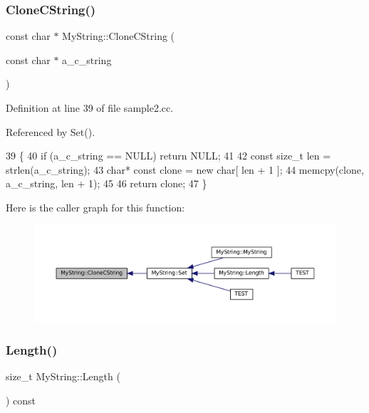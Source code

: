 \subsubsection{\texorpdfstring{Clone\+C\+String()}{CloneCString()}}
{\footnotesize\ttfamily const char $\ast$ My\+String\+::\+Clone\+C\+String (\begin{DoxyParamCaption}\item[{const char $\ast$}]{a\+\_\+c\+\_\+string }\end{DoxyParamCaption})\hspace{0.3cm}{\ttfamily [static]}}



Definition at line 39 of file sample2.\+cc.



Referenced by Set().


\begin{DoxyCode}
39                                                          \{
40   \textcolor{keywordflow}{if} (a\_c\_string == NULL) \textcolor{keywordflow}{return} NULL;
41 
42   \textcolor{keyword}{const} \textcolor{keywordtype}{size\_t} len = strlen(a\_c\_string);
43   \textcolor{keywordtype}{char}* \textcolor{keyword}{const} clone = \textcolor{keyword}{new} \textcolor{keywordtype}{char}[ len + 1 ];
44   memcpy(clone, a\_c\_string, len + 1);
45 
46   \textcolor{keywordflow}{return} clone;
47 \}
\end{DoxyCode}
Here is the caller graph for this function\+:
\nopagebreak
\begin{figure}[H]
\begin{center}
\leavevmode
\includegraphics[width=350pt]{classMyString_a40753dcfa3314a8993f32bdd75d67ce2_icgraph}
\end{center}
\end{figure}
\mbox{\label{classMyString_a4eb168b1ec401a732b3859abe004d648}} 
\subsubsection{\texorpdfstring{Length()}{Length()}}
{\footnotesize\ttfamily size\+\_\+t My\+String\+::\+Length (\begin{DoxyParamCaption}{ }\end{DoxyParamCaption}) const\hspace{0.3cm}{\ttfamily [inline]}}



